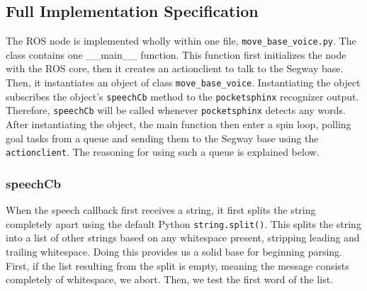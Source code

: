 \documentclass{article}
\begin{document}
\subsection{Full Implementation Specification}
The ROS node is implemented wholly within one file, \texttt{move\_base\_voice.py}. The class contains one \_\_main\_\_ function. This function first initializes the node with the ROS core, then it creates an actionclient to talk to the Segway base. Then, it instantiates an object of class \texttt{move\_base\_voice}. Instantiating the object subscribes the object's \texttt{speechCb} method to the \texttt{pocketsphinx} recognizer output. Therefore, \texttt{speechCb} will be called whenever \texttt{pocketsphinx} detects any words. After instantiating the object, the main function then enter a spin loop, polling goal tasks from a queue and sending them to the Segway base using the \texttt{actionclient}. The reasoning for using such a queue is explained below. \par

\subsubsection{speechCb}
When the speech callback first receives a string, it first splits the string completely apart using the default Python \texttt{string.split()}. This splits the string into a list of other strings based on any whitespace present, stripping leading and trailing whitespace. Doing this provides us a solid base for beginning parsing. First, if the list resulting from the split is empty, meaning the message consists completely of whitespace, we abort. Then, we test the first word of the list.\par

\vspace{5mm}
\end{document}

